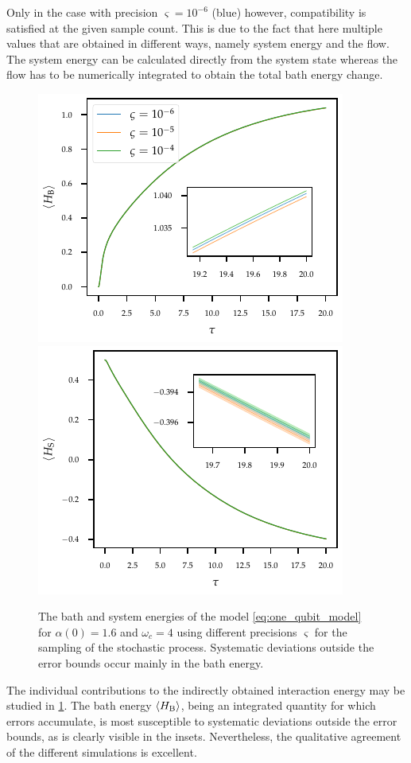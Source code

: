 Only in the case with precision \(\varsigma=10^{-6}\) (blue) however,
compatibility is satisfied at the given sample count. This is due to
the fact that here multiple values that are obtained in different
ways, namely system energy and the flow. The system energy can be
calculated directly from the system state whereas the flow has to be
numerically integrated to obtain the total bath energy change.
\begin{figure}[htp]
  \centering
  \includegraphics{figs/one_bath_syst/stocproc_systematics_bath_energy}
  \includegraphics{figs/one_bath_syst/stocproc_systematics_system}
  \caption{\label{fig:stocproc_bath_sys}The bath and system energies of the
    model \cref{eq:one_qubit_model} for \(α(0)=1.6\) and \(ω_c=4\)
    using different precisions \(\varsigma\) for the sampling of the
    stochastic process. Systematic deviations outside the error bounds
  occur mainly in the bath energy.}
\end{figure}

The individual contributions to the indirectly obtained interaction
energy may be studied in \cref{fig:stocproc_bath_sys}. The bath energy
\(\ev{H_{\bath}}\), being an integrated quantity for which errors
accumulate, is most susceptible to systematic deviations outside the
error bounds, as is clearly visible in the insets. Nevertheless, the
qualitative agreement of the different simulations is excellent.

